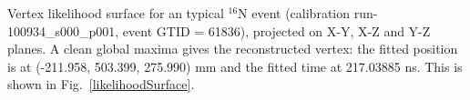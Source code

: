 














Vertex likelihood surface for an typical {$^{16}$}N event (calibration run-100934\_s000\_p001, event GTID = 61836), projected on X-Y, X-Z and Y-Z planes. A clean global maxima gives the reconstructed vertex: the fitted position is at (-211.958, 503.399, 275.990) mm and the fitted time at 217.03885 ns. This is shown in Fig.~\ref{likelihoodSurface}. 

